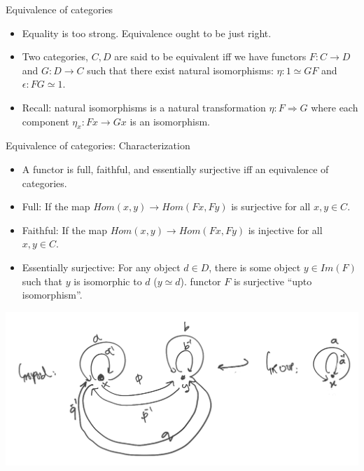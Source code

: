 \documentclass[8pt]{beamer}
\begin{document}
\begin{frame}{Equivalence of categories}
\begin{itemize}
        \item Equality is too strong. Equivalence ought to be just right. \pause
        \item Two categories, $C, D$ are said to be equivalent iff we have functors $F: C \rightarrow D$ and $G: D \rightarrow C$ such that there exist natural isomorphisms: $\eta: 1 \simeq GF$ and $\epsilon: FG \simeq 1$. \pause
        \item Recall: natural isomorphisms is a natural transformation $\eta: F \Rightarrow G$ where each component $\eta_x: Fx \rightarrow Gx$ is an isomorphism. \pause
\end{itemize}
\end{frame}

\begin{frame}{Equivalence of categories: Characterization}
    \begin{itemize}
    \item A functor is full, faithful, and essentially surjective iff an equivalence of categories. \pause
    \item Full: If the map $Hom(x, y) \rightarrow Hom(Fx, Fy)$ is surjective for all $x, y \in C$.
    \item Faithful: If the map $Hom(x, y) \rightarrow Hom(Fx, Fy)$ is injective for all $x, y \in C$.
    \item Essentially surjective: For any object $d \in D$, there is some object $y \in Im(F)$ such that $y$ is isomorphic to $d$ ($y \simeq d$). \pause
           functor $F$  is surjective ``upto isomorphism''.
    \end{itemize} \pause
    \includegraphics[width=\textwidth]{./groupoid-to-group.png}
\end{frame}
\end{document}
